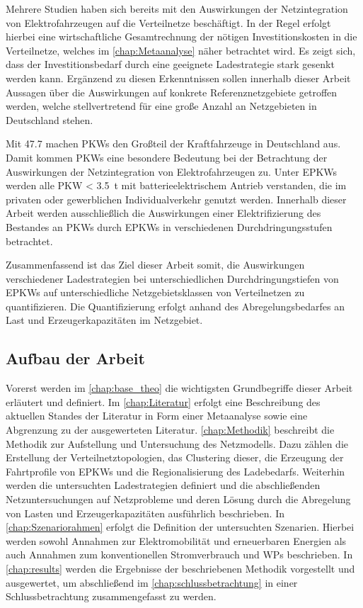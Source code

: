Mehrere Studien haben sich bereits mit den Auswirkungen der Netzintegration von Elektrofahrzeugen auf die Verteilnetze beschäftigt. \cite{Agora2019} \cite{DEAGH2018} \cite{BCG2018}
In der Regel erfolgt hierbei eine wirtschaftliche Gesamtrechnung der nötigen Investitionskosten in die Verteilnetze, welches im \autoref{chap:Metaanalyse} näher betrachtet wird.
Es zeigt sich, dass der Investitionsbedarf durch eine geeignete Ladestrategie stark gesenkt werden kann.
Ergänzend zu diesen Erkenntnissen sollen innerhalb dieser Arbeit Aussagen über die Auswirkungen auf konkrete Referenznetzgebiete getroffen werden, welche stellvertretend für eine große Anzahl an Netzgebieten in Deutschland stehen.\medskip

Mit \SI{47.7}{\MioStk} \cite{KBA2020a} machen \glspl{PKW} den Großteil der Kraftfahrzeuge in Deutschland aus.
Damit kommen \glspl{PKW} eine besondere Bedeutung bei der Betrachtung der Auswirkungen der Netzintegration von Elektrofahrzeugen zu.
Unter \glspl{EPKW} werden alle \gls{PKW} \SI{< 3.5}{\tonne} mit batterieelektrischem Antrieb verstanden, die im privaten oder gewerblichen Individualverkehr genutzt werden. \cite{BNetzA2020}
Innerhalb dieser Arbeit werden ausschließlich die Auswirkungen einer Elektrifizierung des Bestandes an \glspl{PKW} durch \glspl{EPKW} in verschiedenen Durchdringungsstufen betrachtet.\medskip

Zusammenfassend ist das Ziel dieser Arbeit somit, die Auswirkungen verschiedener Lade\-strategien bei unterschiedlichen Durchdringungstiefen von \glspl{EPKW} auf unterschiedliche Netzgebietsklassen von Verteilnetzen zu quantifizieren.
Die Quantifizierung erfolgt anhand des Abregelungsbedarfes an Last und Erzeugerkapazitäten im Netzgebiet.


\subsection{Aufbau der Arbeit}

Vorerst werden im \autoref{chap:base_theo} die wichtigsten Grundbegriffe dieser Arbeit erläutert und definiert.
Im \autoref{chap:Literatur} erfolgt eine Beschreibung des aktuellen Standes der Literatur in Form einer Metaanalyse sowie eine Abgrenzung zu der ausgewerteten Literatur.
\autoref{chap:Methodik} beschreibt die Methodik zur Aufstellung und Untersuchung des Netzmodells.
Dazu zählen die Erstellung der Verteilnetztopologien, das Clustering dieser, die Erzeugung der Fahrtprofile von \glspl{EPKW} und die Regionalisierung des Ladebedarfs.
Weiterhin werden die untersuchten Ladestrategien definiert und die abschließenden Netzuntersuchungen auf Netzprobleme und deren Lösung durch die Abregelung von Lasten und Erzeugerkapazitäten ausführlich beschrieben.
In \autoref{chap:Szenariorahmen} erfolgt die Definition der untersuchten Szenarien.
Hierbei werden sowohl Annahmen zur Elektromobilität und erneuerbaren Energien als auch Annahmen zum konventionellen Stromverbrauch und \glspl{WP} beschrieben.
In \autoref{chap:results} werden die Ergebnisse der beschriebenen Methodik vorgestellt und ausgewertet, um abschließend im \autoref{chap:schlussbetrachtung} in einer Schlussbetrachtung zusammengefasst zu werden.

